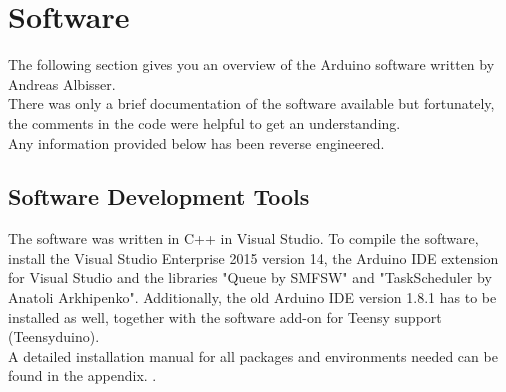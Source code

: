 \section{Software} \label{arduino software analysis}
%
%
The following section gives you an overview of the Arduino software written by Andreas Albisser. \\
There was only a brief documentation of the software available but fortunately, the comments in the code were helpful to get an understanding.\\
Any information provided below has been reverse engineered.\\
%
\subsection{Software Development Tools}
The software was written in C++ in Visual Studio. To compile the software, install the Visual Studio Enterprise 2015 version 14, the Arduino IDE extension for Visual Studio and the libraries "Queue by SMFSW" and "TaskScheduler by Anatoli Arkhipenko". Additionally, the old Arduino IDE version 1.8.1 has to be installed as well, together with the software add-on for Teensy support (Teensyduino).\\
A detailed installation manual for all packages and environments needed can be found in the appendix. .
%

